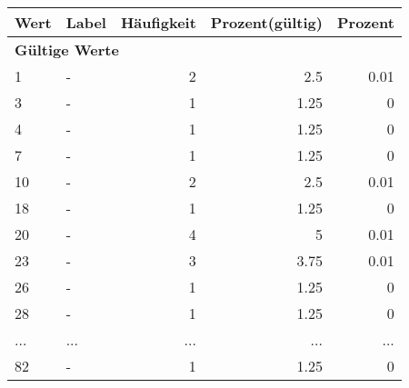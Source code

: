      \begin{longtable}{lXrrr}
     \toprule
     \textbf{Wert} & \textbf{Label} & \textbf{Häufigkeit} & \textbf{Prozent(gültig)} & \textbf{Prozent} \\
     \endhead
     \midrule
     \multicolumn{5}{l}{\textbf{Gültige Werte}}\\
        1 & \multicolumn{1}{X}{-} & %
          \num{2} &
          \num[round-mode=places,round-precision=2]{2.5} &
          \num[round-mode=places,round-precision=2]{0.01} \\
        3 & \multicolumn{1}{X}{-} & %
          \num{1} &
          \num[round-mode=places,round-precision=2]{1.25} &
          \num[round-mode=places,round-precision=2]{0} \\
        4 & \multicolumn{1}{X}{-} & %
          \num{1} &
          \num[round-mode=places,round-precision=2]{1.25} &
          \num[round-mode=places,round-precision=2]{0} \\
        7 & \multicolumn{1}{X}{-} & %
          \num{1} &
          \num[round-mode=places,round-precision=2]{1.25} &
          \num[round-mode=places,round-precision=2]{0} \\
        10 & \multicolumn{1}{X}{-} & %
          \num{2} &
          \num[round-mode=places,round-precision=2]{2.5} &
          \num[round-mode=places,round-precision=2]{0.01} \\
        18 & \multicolumn{1}{X}{-} & %
          \num{1} &
          \num[round-mode=places,round-precision=2]{1.25} &
          \num[round-mode=places,round-precision=2]{0} \\
        20 & \multicolumn{1}{X}{-} & %
          \num{4} &
          \num[round-mode=places,round-precision=2]{5} &
          \num[round-mode=places,round-precision=2]{0.01} \\
        23 & \multicolumn{1}{X}{-} & %
          \num{3} &
          \num[round-mode=places,round-precision=2]{3.75} &
          \num[round-mode=places,round-precision=2]{0.01} \\
        26 & \multicolumn{1}{X}{-} & %
          \num{1} &
          \num[round-mode=places,round-precision=2]{1.25} &
          \num[round-mode=places,round-precision=2]{0} \\
        28 & \multicolumn{1}{X}{-} & %
          \num{1} &
          \num[round-mode=places,round-precision=2]{1.25} &
          \num[round-mode=places,round-precision=2]{0} \\
       ... & ... & ... & ... & ... \\
        82 & \multicolumn{1}{X}{-} & %
          \num{1} &
          \num[round-mode=places,round-precision=2]{1.25} &
          \num[round-mode=places,round-precision=2]{0} \\


\end{longtable}
